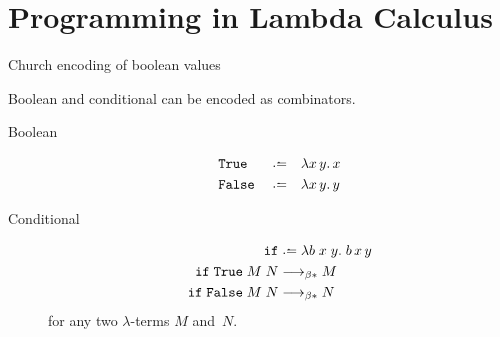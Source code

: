 \section{Programming in Lambda Calculus}
\begin{frame}{Church encoding of boolean values}
  
Boolean and conditional can be encoded as combinators.
  
\begin{description}
  \item[Boolean]
    \begin{align*}
      & \mathtt{True}  && \defeq && \lambda x\,y.\, x \\
      & \mathtt{False} && \defeq && \lambda x\,y.\, y
    \end{align*}

  \item[Conditional]
    \begin{align*}
      \mathtt{if} & \defeq \lambda b\;x\;y.\;b\,x\,y  \\
      \mathtt{if} \;\mathtt{True} \;M\;N &\reduce M \\
      \mathtt{if} \;\mathtt{False}\;M\;N &\reduce N
    \end{align*}
    for any two $\lambda$-terms $M$ and~$N$.
\end{description}

\end{frame}
